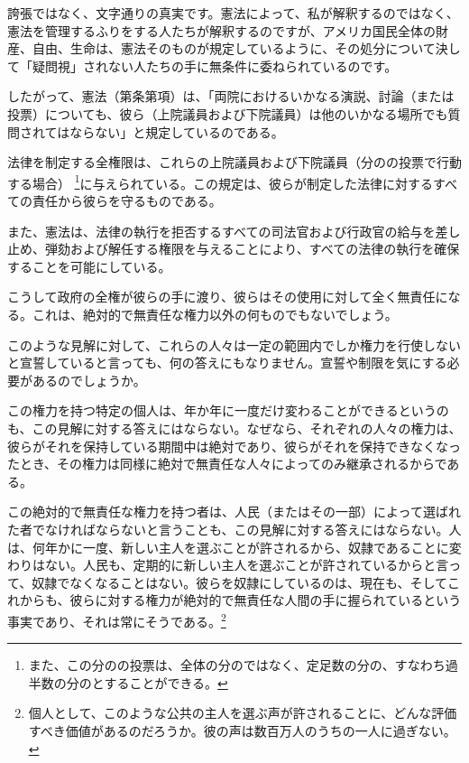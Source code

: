 \documentclass[dvipdfmx, uplatex, tate, landscape]{utbook}
\begin{document}
誇張ではなく、文字通りの真実です。憲法によって、私が解釈するのではなく、憲法を管理するふりをする人たちが解釈するのですが、アメリカ国民全体の財産、自由、生命は、憲法そのものが規定しているように、その処分について決して「疑問視」されない人たちの手に無条件に委ねられているのです。

したがって、憲法（第条第項）は、「両院におけるいかなる演説、討論（または投票）についても、彼ら（上院議員および下院議員）は他のいかなる場所でも質問されてはならない」と規定しているのである。

法律を制定する全権限は、これらの上院議員および下院議員（分のの投票で行動する場合） \footnote{また、この分のの投票は、全体の分のではなく、定足数の分の、すなわち過半数の分のとすることができる。}に与えられている。この規定は、彼らが制定した法律に対するすべての責任から彼らを守るものである。

また、憲法は、法律の執行を拒否するすべての司法官および行政官の給与を差し止め、弾劾および解任する権限を与えることにより、すべての法律の執行を確保することを可能にしている。

こうして政府の全権が彼らの手に渡り、彼らはその使用に対して全く無責任になる。これは、絶対的で無責任な権力以外の何ものでもないでしょう。

このような見解に対して、これらの人々は一定の範囲内でしか権力を行使しないと宣誓していると言っても、何の答えにもなりません。宣誓や制限を気にする必要があるのでしょうか。

この権力を持つ特定の個人は、年か年に一度だけ変わることができるというのも、この見解に対する答えにはならない。なぜなら、それぞれの人々の権力は、彼らがそれを保持している期間中は絶対であり、彼らがそれを保持できなくなったとき、その権力は同様に絶対で無責任な人々によってのみ継承されるからである。

この絶対的で無責任な権力を持つ者は、人民（またはその一部）によって選ばれた者でなければならないと言うことも、この見解に対する答えにはならない。人は、何年かに一度、新しい主人を選ぶことが許されるから、奴隷であることに変わりはない。人民も、定期的に新しい主人を選ぶことが許されているからと言って、奴隷でなくなることはない。彼らを奴隷にしているのは、現在も、そしてこれからも、彼らに対する権力が絶対的で無責任な人間の手に握られているという事実であり、それは常にそうである。\footnote{個人として、このような公共の主人を選ぶ声が許されることに、どんな評価すべき価値があるのだろうか。彼の声は数百万人のうちの一人に過ぎない。}
\end{document}
